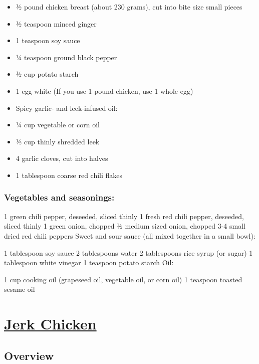 \documentclass[
]{article}
\begin{document}
\begin{itemize}
\item
  ½ pound chicken breast (about 230 grams), cut into bite size small pieces
\item
  ½ teaspoon minced ginger
\item
  1 teaspoon soy sauce
\item
  ¼ teaspoon ground black pepper
\item
  ½ cup potato starch
\item
  1 egg white (If you use 1 pound chicken, use 1 whole egg)
\item
  Spicy garlic- and leek-infused oil:
\item
  ¼ cup vegetable or corn oil
\item
  ½ cup thinly shredded leek
\item
  4 garlic cloves, cut into halves
\item
  1 tablespoon coarse red chili flakes
\end{itemize}

\hypertarget{vegetables-and-seasonings}{%
\subsubsection{Vegetables and seasonings:}\label{vegetables-and-seasonings}}

1 green chili pepper, deseeded, sliced thinly
1 fresh red chili pepper, deseeded, sliced thinly
1 green onion, chopped
½ medium sized onion, chopped
3-4 small dried red chili peppers
Sweet and sour sauce (all mixed together in a small bowl):

1 tablespoon soy sauce
2 tablespoons water
2 tablespoons rice syrup (or sugar)
1 tablespoon white vinegar
1 teaspoon potato starch
Oil:

1 cup cooking oil (grapeseed oil, vegetable oil, or corn oil)
1 teaspoon toasted sesame oil

\hypertarget{jerk-chicken}{%
\section{\texorpdfstring{\href{https://www.seriouseats.com/recipes/2013/08/jerk-chicken.html}{Jerk Chicken}}{Jerk Chicken}}\label{jerk-chicken}}

\hypertarget{overview}{%
\subsection{Overview}\label{overview}}
\end{document}
